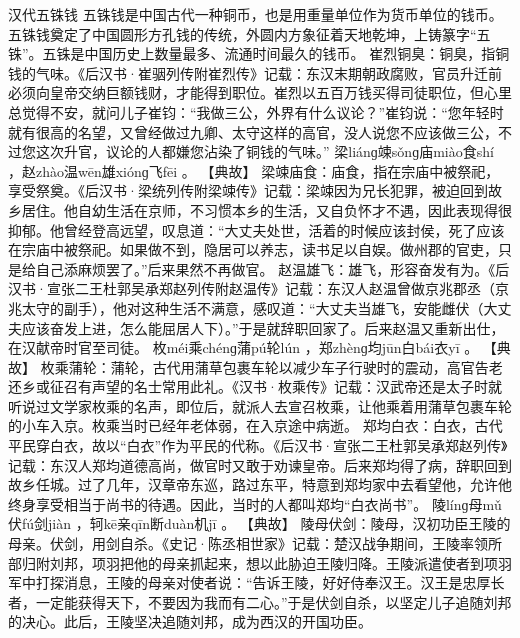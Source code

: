 \documentclass[12pt,UTF8]{ctexbook}
\begin{document}
汉代五铢钱
五铢钱是中国古代一种铜币，也是用重量单位作为货币单位的钱币。五铢钱奠定了中国圆形方孔钱的传统，外圆内方象征着天地乾坤，上铸篆字“五铢”。五铢是中国历史上数量最多、流通时间最久的钱币。
崔烈铜臭：铜臭，指铜钱的气味。《后汉书·崔骃列传附崔烈传》记载：东汉末期朝政腐败，官员升迁前必须向皇帝交纳巨额钱财，才能得到职位。崔烈以五百万钱买得司徒职位，但心里总觉得不安，就问儿子崔钧：“我做三公，外界有什么议论？”崔钧说：“您年轻时就有很高的名望，又曾经做过九卿、太守这样的高官，没人说您不应该做三公，不过您这次升官，议论的人都嫌您沾染了铜钱的气味。”
梁liánɡ竦sǒnɡ庙miào食shí
，赵zhào温wēn雄xiónɡ飞fēi
。
【典故】
梁竦庙食：庙食，指在宗庙中被祭祀，享受祭奠。《后汉书·梁统列传附梁竦传》记载：梁竦因为兄长犯罪，被迫回到故乡居住。他自幼生活在京师，不习惯本乡的生活，又自负怀才不遇，因此表现得很抑郁。他曾经登高远望，叹息道：“大丈夫处世，活着的时候应该封侯，死了应该在宗庙中被祭祀。如果做不到，隐居可以养志，读书足以自娱。做州郡的官吏，只是给自己添麻烦罢了。”后来果然不再做官。
赵温雄飞：雄飞，形容奋发有为。《后汉书·宣张二王杜郭吴承郑赵列传附赵温传》记载：东汉人赵温曾做京兆郡丞（京兆太守的副手），他对这种生活不满意，感叹道：“大丈夫当雄飞，安能雌伏（大丈夫应该奋发上进，怎么能屈居人下）。”于是就辞职回家了。后来赵温又重新出仕，在汉献帝时官至司徒。
枚méi乘chénɡ蒲pú轮lún
，郑zhènɡ均jūn白bái衣yī
。
【典故】
枚乘蒲轮：蒲轮，古代用蒲草包裹车轮以减少车子行驶时的震动，高官告老还乡或征召有声望的名士常用此礼。《汉书·枚乘传》记载：汉武帝还是太子时就听说过文学家枚乘的名声，即位后，就派人去宣召枚乘，让他乘着用蒲草包裹车轮的小车入京。枚乘当时已经年老体弱，在入京途中病逝。
郑均白衣：白衣，古代平民穿白衣，故以“白衣”作为平民的代称。《后汉书·宣张二王杜郭吴承郑赵列传》记载：东汉人郑均道德高尚，做官时又敢于劝谏皇帝。后来郑均得了病，辞职回到故乡任城。过了几年，汉章帝东巡，路过东平，特意到郑均家中去看望他，允许他终身享受相当于尚书的待遇。因此，当时的人都叫郑均“白衣尚书”。
陵línɡ母mǔ伏fú剑jiàn
，轲kē亲qīn断duàn机jī
。
【典故】
陵母伏剑：陵母，汉初功臣王陵的母亲。伏剑，用剑自杀。《史记·陈丞相世家》记载：楚汉战争期间，王陵率领所部归附刘邦，项羽把他的母亲抓起来，想以此胁迫王陵归降。王陵派遣使者到项羽军中打探消息，王陵的母亲对使者说：“告诉王陵，好好侍奉汉王。汉王是忠厚长者，一定能获得天下，不要因为我而有二心。”于是伏剑自杀，以坚定儿子追随刘邦的决心。此后，王陵坚决追随刘邦，成为西汉的开国功臣。
\end{document}
